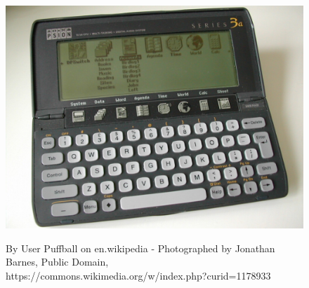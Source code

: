 

\begin{frame}{}
    \begin{figure}
        \includegraphics{images/Psion_Series_3a}

        \footnotesize{By User Puffball on en.wikipedia - Photographed by Jonathan Barnes, Public Domain,
        https://commons.wikimedia.org/w/index.php?curid=1178933}
    \end{figure}
\end{frame}
